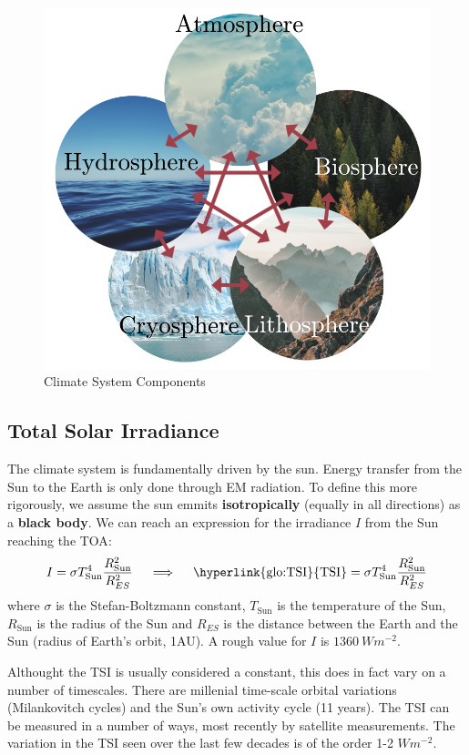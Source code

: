 \begin{figure}[h]
    \centering
    \includegraphics[scale=0.5]{figures/climate_system_components.png}
    \caption{Climate System Components}
    \label{fig:ClimateSystem}
\end{figure}

\subsection{Total Solar Irradiance}
The climate system is fundamentally driven by the sun. Energy transfer from the Sun to the Earth is only done through
EM radiation. To define this more rigorously, we assume the sun emmits \textbf{isotropically} (equally in all directions)
as a \textbf{black body}. We can reach an expression for the irradiance $I$ from the Sun reaching the \gls{TOA}:
$$
I = \sigma T_{\text{Sun}}^4 \frac{R_{\text{Sun}}^2}{R_{ES}^2} \quad \implies \quad \text{\hyperlink{glo:TSI}{TSI}} = \sigma 
T_{\text{Sun}}^4 \frac{R_{\text{Sun}}^2}{R_{ES}^2}
$$
where $\sigma$ is the Stefan-Boltzmann constant, $T_{\text{Sun}}$ is the temperature of the Sun, $R_{\text{Sun}}$ is the
radius of the Sun and $R_{ES}$ is the distance between the Earth and the Sun (radius of Earth's orbit, 1AU). A rough 
value for $I$ is $1360\ Wm^{-2}$.

Althought the \gls{TSI} is usually considered a constant, this does in fact vary on a number of timescales.
There are millenial time-scale orbital variations (Milankovitch cycles) and the Sun's own activity cycle (11 years). 
The \gls{TSI} can be measured in a number of ways, most recently by satellite measurements. The variation in 
the \gls{TSI} seen over the last few decades is of the order 1-2 $Wm^{-2}$.

